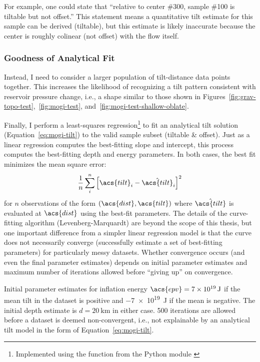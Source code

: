 For example, one could state that ``relative to center \#300, sample \#100 is tiltable but not offset.'' This statement means a quantitative tilt estimate for this sample can be derived (tiltable), but this estimate is likely inaccurate because the center is roughly colinear (not offset) with the flow itself. 

\subsubsection{Goodness of Analytical Fit}\label{sec:inflation-center}

Instead, I need to consider a larger population of tilt-distance data points together. This increases the likelihood of recognizing a tilt pattern consistent with reservoir pressure change, i.e., a shape similar to those shown in Figures~\ref{fig:grav-topo-test},~\ref{fig:mogi-test}, and~\ref{fig:mogi-test-shallow-oblate}.

Finally, I perform a least-squares regression\footnote{Implemented using the  function from the  Python module \parencite{2020SciPy-NMeth}} to fit an analytical tilt solution (Equation~\ref{eq:mogi-tilt}) to the valid sample subset (tiltable \& offset). Just as a linear regression computes the best-fitting slope and intercept, this process computes the best-fitting depth and energy parameters. In both cases, the best fit minimizes the mean square error:
\begin{equation}
    \frac{1}{n}\sum_{i}^{n}{\left[\acs{tilt}_i-\hat{\acs{tilt}}_i\right]}^2\label{eq:mse}
\end{equation}
for $n$ observations of the form $(\acs{dist}, \acs{tilt})$ where $\hat{\acs{tilt}}$ is evaluated at $\acs{dist}$ using the best-fit parameters. The details of the curve-fitting algorithm (Levenberg-Marquardt) are beyond the scope of this thesis, but one important difference from a simpler linear regression model is that the curve does not necessarily converge (successfully estimate a set of best-fitting parameters) for particularly messy datasets. Whether convergence occurs (and even the final parameter estimates) depends on initial parameter estimates and maximum number of iterations allowed before ``giving up'' on convergence.

Initial parameter estimates for inflation energy $\acs{epv} = \qty{7e19}{\J}$ if the mean tilt in the dataset is positive and \qty{-7e19}{\J} if the mean is negative. The initial depth estimate is $d = \qty{20}{\km}$ in either case. 500 iterations are allowed before a dataset is deemed non-convergent, i.e., not explainable by an analytical tilt model in the form of Equation~\eqref{eq:mogi-tilt}.

